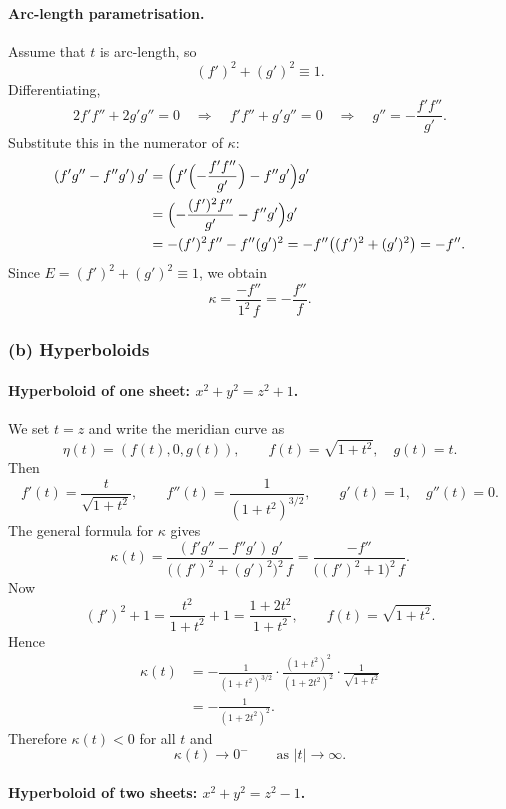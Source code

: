 \documentclass[12pt,a4paper]{article}
\theoremstyle{plain}
\theoremstyle{definition}      %
\begin{document}
\paragraph{Arc-length parametrisation.}
Assume that $t$ is arc-length, so
\[
(f')^2+(g')^2 \equiv 1.
\]
Differentiating,
\[
2f'f'' + 2g'g'' = 0
\quad\Longrightarrow\quad
f'f'' + g'g'' = 0
\quad\Longrightarrow\quad
g'' = -\frac{f'f''}{g'}.
\]
Substitute this in the numerator of $\kappa$:
\[
\begin{aligned}
	(f'g''-f''g')\,g'
	&= \Bigl( f'\Bigl(-\frac{f'f''}{g'}\Bigr) - f''g' \Bigr)g' \\
	&= \Bigl( -\frac{(f')^2 f''}{g'} - f''g' \Bigr) g' \\
	&= - (f')^2 f'' - f''(g')^2
	= -f''\bigl((f')^2 + (g')^2\bigr)
	= -f''.
\end{aligned}
\]
Since $E=(f')^2+(g')^2\equiv 1$, we obtain
\[
\kappa
= \frac{-f''}{1^2\,f}
= -\frac{f''}{f}.
\]

\subsubsection*{(b) Hyperboloids}

\paragraph{Hyperboloid of one sheet: $x^2+y^2=z^2+1$.}

We set $t=z$ and write the meridian curve as
\[
\eta(t) = (f(t),0,g(t)),\qquad f(t) = \sqrt{1+t^2},\quad g(t)=t.
\]
Then
\[
f'(t) = \frac{t}{\sqrt{1+t^2}},\qquad
f''(t) = \frac{1}{(1+t^2)^{3/2}},\qquad
g'(t)=1,\quad g''(t)=0.
\]
The general formula for $\kappa$ gives
\[
\kappa(t)
= \frac{(f'g''-f''g')\,g'}{\bigl((f')^2+(g')^2\bigr)^2\,f}
= \frac{-f''}{\bigl((f')^2+1\bigr)^2\,f}.
\]
Now
\[
(f')^2 + 1
= \frac{t^2}{1+t^2} + 1
= \frac{1+2t^2}{1+t^2},
\qquad
f(t) = \sqrt{1+t^2}.
\]
Hence
\[
\begin{aligned}
	\kappa(t)
	&= -\frac{1}{(1+t^2)^{3/2}}
	\cdot \frac{(1+t^2)^2}{(1+2t^2)^2}
	\cdot \frac{1}{\sqrt{1+t^2}} \\
	&= -\frac{1}{(1+2t^2)^2}.
\end{aligned}
\]
Therefore $\kappa(t)<0$ for all $t$ and
\[
\kappa(t)\longrightarrow 0^{-}\qquad\text{as }|t|\to\infty.
\]

\paragraph{Hyperboloid of two sheets: $x^2+y^2=z^2-1$.}
\end{document}
